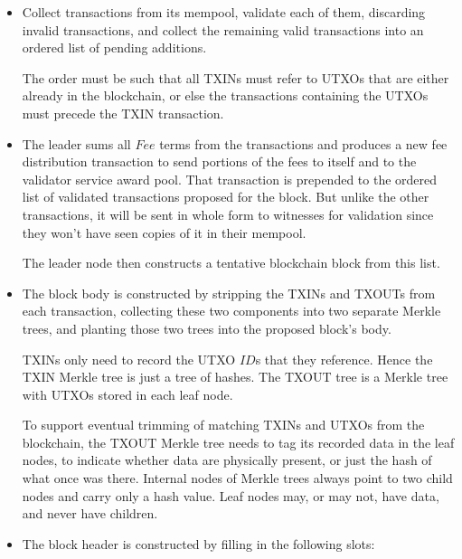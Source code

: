 \documentclass[8pt,fleqn,openany]{book}
\begin{document}
\begin{itemize}
  \item {Collect transactions from its mempool, validate each of them, discarding invalid transactions, and collect the remaining valid transactions into an ordered list of pending additions.

  The order must be such that all TXINs must refer to UTXOs that are either already in the blockchain, or else the transactions containing the UTXOs must precede the TXIN transaction.}
  \item {The leader sums all $Fee$ terms from the transactions and produces a new fee distribution transaction to send portions of the fees to itself and to the validator service award pool. That transaction is prepended to the ordered list of validated transactions proposed for the block. But unlike the other transactions, it will be sent in whole form to witnesses for validation since they won't have seen copies of it in their mempool.

  The leader node then constructs a tentative blockchain block from this list.}
  \item {The block body is constructed by stripping the TXINs and TXOUTs from each transaction, collecting these two components into two separate Merkle trees, and planting those two trees into the proposed block's body.

  TXINs only need to record the UTXO $ID$s that they reference. Hence the TXIN Merkle tree is just a tree of hashes. The TXOUT tree is a Merkle tree with UTXOs stored in each leaf node.

  To support eventual trimming of matching TXINs and UTXOs from the blockchain, the TXOUT Merkle tree needs to tag its recorded data in the leaf nodes, to indicate whether data are physically present, or just the hash of what once was there. Internal nodes of Merkle trees always point to two child nodes and carry only a hash value. Leaf nodes may, or may not, have data, and never have children.}
  \item {The block header is constructed by filling in the following slots:

}
\end{itemize}
\end{document}
